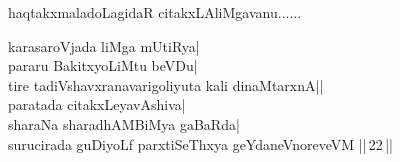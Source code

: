 \begin{entry}
\gl{}
\begin{shl}
haqtakxmaladoLagidaR citakxLAliMgavanu......
\end{shl}
\end{entry}

\begin{entry}
\begin{shl}
karasaroVjada liMga mUtiRya|\\
pararu BakitxyoLiMtu beVDu|\\tire tadiVshavxranavarigoliyuta kali
dinaMtarxnA||\\paratada citakxLeyavAshiva|\\sharaNa sharadhAMBiMya
gaBaRda|\\ surucirada guDiyoLf parxtiSeThxya geYdaneVnoreveVM ||\,22\,|| 
\end{shl}
\gl{}
\mng{}
\end{entry}

